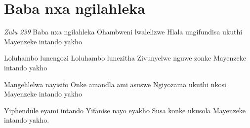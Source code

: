 \starttocol
\chapter{Baba nxa ngilahleka}
\nexttocol
\hfill{\it Zulu 239}
\stoptocol
\starttocol
\startlines
{\sc Baba} nxa ngilahleka
Ohambweni lwalelizwe
Hlala ungifundisa ukuthi
Mayenzeke intando yakho

Loluhambo lunengozi
Loluhambo lunezitha
Zivunyelwe nguwe zonke
Mayenzeke intando yakho

Mangehlelwa nayisifo
Onke amandla ami asuswe
Ngiyozama ukuthi nkosi
Mayenzeke intando yakho

Yiphendule eyami intando
Yifanise nayo eyakho
Susa konke ukusola
Mayenzeke intando yakho.
\stoplines
\nexttocol

\stoptocol

